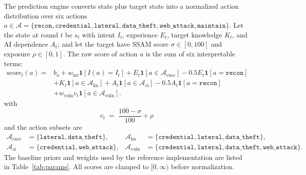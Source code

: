 \documentclass[11pt]{article}
\newcommand{\act}[1]{\texttt{#1}}
\begin{document}
The prediction engine converts state plus target state into a normalized
action distribution over six actions $a \in \mathcal{A} = \{\act{recon},
\act{credential}, \act{lateral}, \act{data\_theft}, \act{web\_attack},
\act{maintain}\}$. Let the state at round $t$ be $s_t$ with intent $I_t$,
experience $E_t$, target knowledge $K_t$, and AI dependence $A_t$; and let
the target have SSAM score $\sigma \in [0,100]$ and exposure
$\rho \in [0,1]$. The raw score of action $a$ is the sum of six
interpretable terms:
\begin{equation}
\label{eq:score}
\begin{aligned}
\mathrm{score}_t(a) ={}& b_a + w_{\mathrm{int}}\mathbf{1}[I(a)=I_t]
+ E_t\mathbf{1}[a\in\mathcal{A}_{\mathrm{exec}}]
-0.5E_t\mathbf{1}[a=\act{recon}]\\
&+ K_t\mathbf{1}[a\in\mathcal{A}_{\mathrm{kn}}]
+ A_t\mathbf{1}[a\in\mathcal{A}_{\mathrm{ai}}]
-0.5A_t\mathbf{1}[a=\act{recon}]\\
&+ w_{\mathrm{vuln}}v_t\mathbf{1}[a\in\mathcal{A}_{\mathrm{vuln}}].
\end{aligned}
\end{equation}
with
\begin{equation}
v_t \;=\; \frac{100-\sigma}{100} + \rho
\label{eq:vuln}
\end{equation}
and the action subsets are
\[
\begin{aligned}
\mathcal{A}_{\mathrm{exec}} &= \{\act{lateral}, \act{data\_theft}\}, &
\mathcal{A}_{\mathrm{kn}} &= \{\act{credential}, \act{lateral}, \act{data\_theft}\},\\
\mathcal{A}_{\mathrm{ai}} &= \{\act{credential}, \act{web\_attack}\}, &
\mathcal{A}_{\mathrm{vuln}} &= \{\act{credential}, \act{lateral}, \act{data\_theft}, \act{web\_attack}\}.
\end{aligned}
\]
The baseline priors and weights used by the reference implementation are
listed in Table~\ref{tab:params}. All scores are clamped to $[0,\infty)$
before normalization.
\end{document}
